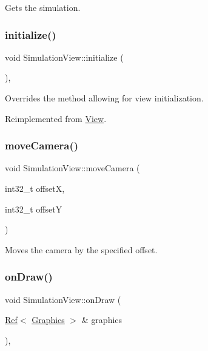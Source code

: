 Gets the simulation. 

\mbox{\label{class_simulation_view_ad54da8596a97ae64ecf71b05038587fc}} 
\subsubsection{\texorpdfstring{initialize()}{initialize()}}
{\footnotesize\ttfamily void Simulation\+View\+::initialize (\begin{DoxyParamCaption}{ }\end{DoxyParamCaption})\hspace{0.3cm}{\ttfamily [override]}, {\ttfamily [virtual]}}



Overrides the method allowing for view initialization. 



Reimplemented from \mbox{\hyperlink{class_view_a334fa9a19d2faca0120ef2869c3dd8ad}{View}}.

\mbox{\label{class_simulation_view_a04da3a65238673745d1aa7ed030c4780}} 
\subsubsection{\texorpdfstring{moveCamera()}{moveCamera()}}
{\footnotesize\ttfamily void Simulation\+View\+::move\+Camera (\begin{DoxyParamCaption}\item[{int32\+\_\+t}]{offsetX,  }\item[{int32\+\_\+t}]{offsetY }\end{DoxyParamCaption})}



Moves the camera by the specified offset. 

\mbox{\label{class_simulation_view_a088d2d9c386b7202fe0d552323c137c3}} 
\subsubsection{\texorpdfstring{onDraw()}{onDraw()}}
{\footnotesize\ttfamily void Simulation\+View\+::on\+Draw (\begin{DoxyParamCaption}\item[{\mbox{\hyperlink{class_ref}{Ref}}$<$ \mbox{\hyperlink{class_graphics}{Graphics}} $>$ \&}]{graphics }\end{DoxyParamCaption})\hspace{0.3cm}{\ttfamily [override]}, {\ttfamily [virtual]}}



